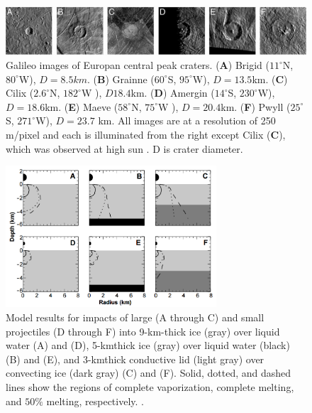 \begin{figure}[htb]
	\centering
	\includegraphics[width=\textwidth]{figures/Rasmus/Impacts}
	\caption{Galileo images of Europan central peak craters. (\textbf{A}) Brigid ($11^\circ$N, $80^\circ$W), $D=8.5km$. (\textbf{B}) Grainne ($60^\circ$S, $95^\circ$W), $D=13.5$km. (\textbf{C}) Cilix ($2.6^\circ$N, $182^\circ$W ), $D18.4$km. (\textbf{D}) Amergin ($14^\circ$S, $230^\circ$W), $D=18.6$km. (\textbf{E}) Maeve ($58^\circ$N, $75^\circ$W ), $D=20.4$km. (\textbf{F}) Pwyll ($25^\circ$S, $271^\circ$W), $D=23.7$ km. All images are at a resolution of 250 m/pixel and each is illuminated from the right except Cilix (\textbf{C}), which was observed at high sun
	\cite{ThickImpact}. D is crater diameter. \label{fig:ImpactPic}}
\end{figure}
\begin{figure}[!htb]
	\centering
	\includegraphics[width=0.7\textwidth]{figures/Rasmus/Impacts2}
	\caption{Model results for impacts of large (A through C) and small projectiles (D through F) into 9-km-thick ice (gray) over liquid water (A) and (D), 5-kmthick ice (gray) over liquid water (black) (B) and (E), and 3-kmthick conductive lid (light gray) over convecting ice (dark gray) (C) and (F). Solid, dotted, and dashed lines show the regions of complete vaporization, complete melting, and $50\%$ melting, respectively.
	\cite{ThickImpact}.\label{fig:ImpactSim}}
\end{figure}
\\
